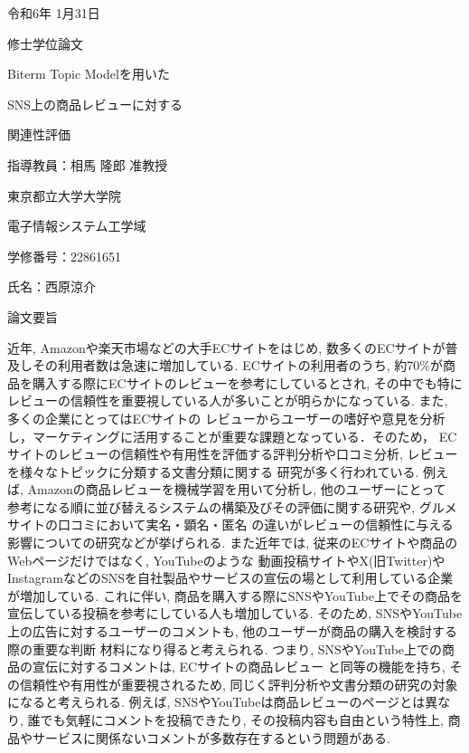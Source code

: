 \documentclass{ltjarticle}
\begin{document}
\begin{titlepage}
    \begin{center}
        {\Large 令和6年 1月31日}
        \vspace{20truept}

        {\LARGE 修士学位論文}
        \vspace*{180truept}

        {\Huge Biterm Topic Modelを用いた}\par
        {\Huge SNS上の商品レビューに対する}\par
        {\Huge 関連性評価}
        \vspace{160truept}

        {\Large 指導教員：相馬 隆郎 准教授}
        \vspace{30truept}

        {\Large 東京都立大学大学院}
        \vspace{10truept}

        {\Large 電子情報システム工学域}
        \vspace{30truept}

        {\Large 学修番号：22861651}
        \vspace{10truept}
        
        {\Large 氏名：西原涼介}
    \end{center}
\end{titlepage}
\noindent
{\LARGE 論文要旨}
\vspace{20truept}

近年, Amazonや楽天市場などの大手ECサイトをはじめ, 数多くのECサイトが普及しその利用者数は急速に増加している. 
ECサイトの利用者のうち, 約70\%が商品を購入する際にECサイトのレビューを参考にしているとされ, 
その中でも特にレビューの信頼性を重要視している人が多いことが明らかになっている. また, 多くの企業にとってはECサイトの
レビューからユーザーの嗜好や意見を分析し，マーケティングに活用することが重要な課題となっている．そのため，
ECサイトのレビューの信頼性や有用性を評価する評判分析や口コミ分析, レビューを様々なトピックに分類する文書分類に関する
研究が多く行われている. 例えば, Amazonの商品レビューを機械学習を用いて分析し, 他のユーザーにとって
参考になる順に並び替えるシステムの構築及びその評価に関する研究や, グルメサイトの口コミにおいて実名・顕名・匿名
の違いがレビューの信頼性に与える影響についての研究などが挙げられる. 
また近年では, 従来のECサイトや商品のWebページだけではなく, YouTubeのような
動画投稿サイトやX(旧Twitter)やInstagramなどのSNSを自社製品やサービスの宣伝の場として利用している企業が増加している. 
これに伴い, 商品を購入する際にSNSやYouTube上でその商品を宣伝している投稿を参考にしている人も増加している. 
そのため, SNSやYouTube上の広告に対するユーザーのコメントも, 他のユーザーが商品の購入を検討する際の重要な判断
材料になり得ると考えられる. つまり, SNSやYouTube上での商品の宣伝に対するコメントは, ECサイトの商品レビュー
と同等の機能を持ち, その信頼性や有用性が重要視されるため, 同じく評判分析や文書分類の研究の対象になると考えられる. 
例えば, SNSやYouTubeは商品レビューのページとは異なり, 誰でも気軽にコメントを投稿できたり, その投稿内容も自由という特性上, 
商品やサービスに関係ないコメントが多数存在するという問題がある.
\end{document}
